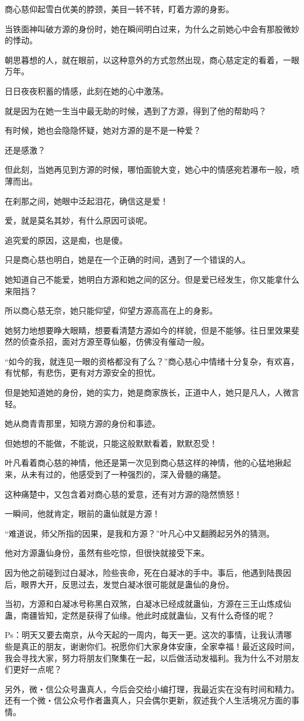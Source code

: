 \begin{this_body}
商心慈仰起雪白优美的脖颈，美目一转不转，盯着方源的身影。

当铁面神叫破方源的身份时，她在瞬间明白过来，为什么之前她心中会有那股微妙的悸动。

朝思暮想的人，就在眼前，以这种意外的方式忽然出现，商心慈定定的看着，一眼万年。

日日夜夜积蓄的情感，此刻在她的心中激荡。

就是因为在她一生当中最无助的时候，遇到了方源，得到了他的帮助吗？

有时候，她也会隐隐怀疑，她对方源的是不是一种爱？

还是感激？

但此刻，当她再见到方源的时候，哪怕面貌大变，她心中的情感宛若瀑布一般，喷薄而出。

在刹那之间，她眼中泛起泪花，确信这是爱！

爱，就是莫名其妙，有什么原因可谈呢。

追究爱的原因，这是痴，也是傻。

只是商心慈也明白，她是在一个正确的时间，遇到了一个错误的人。

她知道自己不能爱，她明白方源和她之间的区分。但是爱已经发生，你又能拿什么来阻挡？

所以商心慈无奈，她只能仰望，仰望方源高高在上的身影。

她努力地想要睁大眼睛，想要看清楚方源如今的样貌，但是不能够。往日里效果斐然的侦查杀招，面对方源至尊仙躯，仿佛没有催动一般。

“如今的我，就连见一眼的资格都没有了么？”商心慈心中情绪十分复杂，有欢喜，有忧郁，有悲伤，更有对方源安全的担忧。

但是她知道她的身份，她的实力，她是商家族长，正道中人，她只是凡人，人微言轻。

她从商青青那里，知晓方源的身份和事迹。

但她想的不能做，不能说，只能这般默默看着，默默忍受！

叶凡看着商心慈的神情，他还是第一次见到商心慈这样的神情，他的心猛地揪起来，从未有过的，他感受到了一种强烈的，深入骨髓的痛楚。

这种痛楚中，又包含着对商心慈的爱意，还有对方源的隐然愤怒！

一瞬间，他就肯定，眼前的蛊仙就是方源！

“难道说，师父所指的因果，是我和方源？”叶凡心中又翻腾起另外的猜测。

他对方源蛊仙身份，虽然有些吃惊，但很快就接受下来。

因为他之前碰到过白凝冰，险些丧命，死在白凝冰的手中。事后，他遇到陆畏因后，眼界大开，反思过去，发觉白凝冰很可能就是蛊仙的身份。

当初，方源和白凝冰号称黑白双煞，白凝冰已经成就蛊仙，方源在三王山炼成仙蛊，南疆皆知，定然是获得了仙缘。他此时成就蛊仙，又有什么奇怪的呢？

Ps：明天又要去南京，从今天起的一周内，每天一更。这次的事情，让我认清哪些是真正的朋友，谢谢你们。祝愿你们大家身体安康，全家幸福！最近这段时间，我会寻找大家，努力将朋友们聚集在一起，以后做活动发福利。我为什么不对朋友们更好一点呢？

另外，微・信公众号蛊真人，今后会交给小编打理，我最近实在没有时间和精力。还有一个微・信公众号作者蛊真人，只会偶尔更新，叙述我个人生活境况方面的事情。

\end{this_body}

